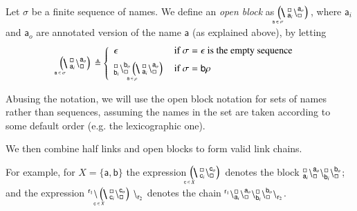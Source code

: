 \begin{definition}
Let $\sigma$ be a finite sequence of names. We 
define an \emph{open block} as $\blockchain{\mathsf{a}_i}{\mathsf{a}_o}{\mathsf{a} \in \sigma}$, where $\mathsf{a}_i$ and $\mathsf{a}_o$ are annotated version of the name $\mathsf{a}$ (as explained above), by letting
\[
\blockchain{\mathsf{a}_i}{\mathsf{a}_o}{\mathsf{a} \in \sigma} \defeq
\left\{
\begin{array}{ll}
\epsilon 
& \mbox{if $\sigma=\epsilon$ is the empty sequence}\\[5pt]
{}_{\mathsf{b}_i}^{\noact}\chainedlink{\noact}{\mathsf{b}_o}\blockchain{\mathsf{a}_i}{\mathsf{a}_o}{\mathsf{a} \in \rho}
& \mbox{if $\sigma=\mathsf{b}\rho$}
\end{array}
\right.
\]
\end{definition}

Abusing the notation, we will use the open block notation for sets of names rather than sequences, assuming the names in the set are taken  according to some default order (e.g. the lexicographic one).

We then combine half links and  open blocks to form valid link chains.
%

 For example, for $X = \{\mathsf{a},\mathsf{b}\}$ the expression $ \blockchain{\mathsf{c}_i}{\mathsf{c}_o}{\mathsf{c} \in X} $
denotes the block ${}_{\mathsf{a}_i}^{\scriptstyle {\square}}\backslash_{\scriptstyle {\square}}^{\mathsf{a}_o} \backslash{}_{\mathsf{b}_i}^{\scriptstyle {\square}}\backslash_{\scriptstyle {\square}}^{\mathsf{b}_o}$; and the expression $\link{\mathsf{r}_1}{} \blockchain{\mathsf{c}_i}{\mathsf{c}_o}{\mathsf{c} \in X}\link{}{\mathsf{r}_2} $ denotes the chain 
$ {}^{\mathsf{r}_1}_{}\backslash_{\mathsf{a}_i}^{\scriptstyle {\square}}\backslash_{\scriptstyle {\square}}^{\mathsf{a}_o}\backslash_{\mathsf{b}_i}^{\scriptstyle {\square}}\backslash_{\scriptstyle {\square}}^{\mathsf{b}_o}\backslash_{\mathsf{r}_2}^{}$.
